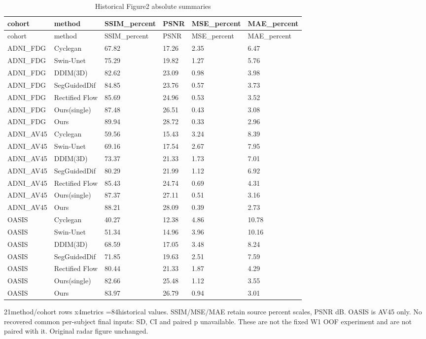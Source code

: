 \begingroup
\footnotesize
\setlength{\tabcolsep}{4pt}
\begin{longtable}{llllll}
\caption{Historical Figure2 absolute summaries}\label{tab:s-n20}\\
\toprule
cohort & method & SSIM\_percent & PSNR & MSE\_percent & MAE\_percent \\
\midrule
\endfirsthead
\toprule
cohort & method & SSIM\_percent & PSNR & MSE\_percent & MAE\_percent \\
\midrule
\endhead
\bottomrule
\endfoot
ADNI\_FDG & Cyclegan & 67.82 & 17.26 & 2.35 & 6.47 \\
ADNI\_FDG & Swin-Unet & 75.29 & 19.82 & 1.27 & 5.76 \\
ADNI\_FDG & DDIM(3D) & 82.62 & 23.09 & 0.98 & 3.98 \\
ADNI\_FDG & SegGuidedDif & 84.85 & 23.76 & 0.57 & 3.73 \\
ADNI\_FDG & Rectified Flow & 85.69 & 24.96 & 0.53 & 3.52 \\
ADNI\_FDG & Ours(single) & 87.48 & 26.51 & 0.43 & 3.08 \\
ADNI\_FDG & Ours & 89.94 & 28.72 & 0.33 & 2.96 \\
ADNI\_AV45 & Cyclegan & 59.56 & 15.43 & 3.24 & 8.39 \\
ADNI\_AV45 & Swin-Unet & 69.16 & 17.54 & 2.67 & 7.95 \\
ADNI\_AV45 & DDIM(3D) & 73.37 & 21.33 & 1.73 & 7.01 \\
ADNI\_AV45 & SegGuidedDif & 80.29 & 21.99 & 1.12 & 6.92 \\
ADNI\_AV45 & Rectified Flow & 85.43 & 24.74 & 0.69 & 4.31 \\
ADNI\_AV45 & Ours(single) & 87.37 & 27.11 & 0.51 & 3.16 \\
ADNI\_AV45 & Ours & 88.21 & 28.09 & 0.39 & 2.73 \\
OASIS & Cyclegan & 40.27 & 12.38 & 4.86 & 10.78 \\
OASIS & Swin-Unet & 51.34 & 14.96 & 3.96 & 10.16 \\
OASIS & DDIM(3D) & 68.59 & 17.05 & 3.48 & 8.24 \\
OASIS & SegGuidedDif & 71.85 & 19.63 & 2.51 & 7.59 \\
OASIS & Rectified Flow & 80.44 & 21.33 & 1.87 & 4.29 \\
OASIS & Ours(single) & 82.66 & 25.48 & 1.12 & 3.55 \\
OASIS & Ours & 83.97 & 26.79 & 0.94 & 3.01 \\
\end{longtable}
\noindent\parbox{\linewidth}{\footnotesize 21method/cohort rows x4metrics =84historical values. SSIM/MSE/MAE retain source percent scales, PSNR dB. OASIS is AV45 only. No recovered common per-subject final inputs: SD, CI and paired p unavailable. These are not the fixed W1 OOF experiment and are not paired with it. Original radar figure unchanged.}
\endgroup
